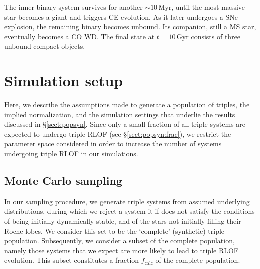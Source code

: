 \documentclass[twocolumn,appendixfloats,tighten]{aastex631}
\newcommand{\myr}{\mathrm{Myr}}
\newcommand{\gyr}{\mathrm{Gyr}}
\begin{document}
The inner binary system survives for another $\sim 10 \, \myr$, until the most massive star becomes a giant and triggers CE evolution. As it later undergoes a SNe explosion, the remaining binary becomes unbound. Its companion, still a MS star, eventually becomes a CO WD. The final state at $t=10\,\gyr$ consists of three unbound compact objects. 



\section{Simulation setup}
\label{sect:ICs}
Here, we describe the assumptions made to generate a population of triples, the implied normalization, and the simulation settings that underlie the results discussed in \S\ref{sect:popsyn}. Since only a small fraction of all triple systems are expected to undergo triple RLOF (see \S\ref{sect:popsyn:frac}), we restrict the parameter space considered in order to increase the number of systems undergoing triple RLOF in our simulations.


\subsection{Monte Carlo sampling}
\label{sect:ICs:mc}
In our sampling procedure, we generate triple systems from assumed underlying distributions, during which we reject a system it if does not satisfy the conditions of being initially dynamically stable, and of the stars not initially filling their Roche lobes. We consider this set to be the `complete' (synthetic) triple population. Subsequently, we consider a subset of the complete population, namely those systems that we expect are more likely to lead to triple RLOF evolution. This subset constitutes a fraction $f_\mathrm{calc}$ of the complete population. 
\end{document}
